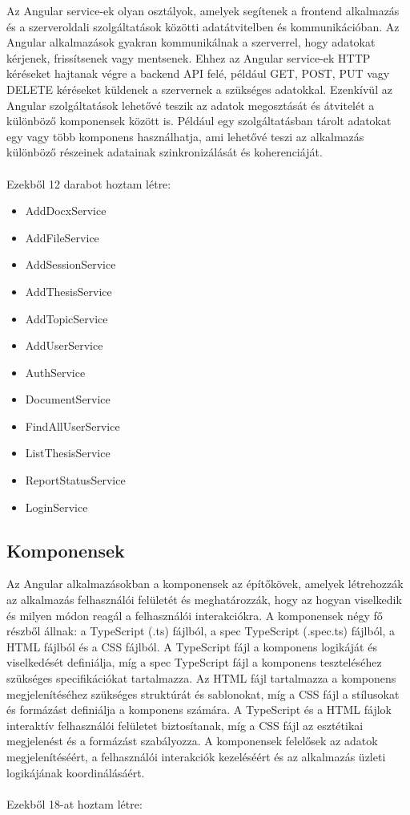 Az Angular\cite{angular} service-ek olyan osztályok, amelyek segítenek a frontend alkalmazás és a szerveroldali  szolgáltatások közötti adatátvitelben és kommunikációban. Az Angular alkalmazások gyakran kommunikálnak a szerverrel, hogy adatokat kérjenek, frissítsenek vagy mentsenek. Ehhez az Angular\cite{angular} service-ek HTTP\cite{http} kéréseket hajtanak végre a backend API felé, például GET, POST, PUT vagy DELETE kéréseket küldenek a szervernek a szükséges adatokkal. Ezenkívül az Angular\cite{angular} szolgáltatások lehetővé teszik az adatok megosztását és átvitelét a különböző komponensek között is. Például egy szolgáltatásban tárolt adatokat egy vagy több komponens használhatja, ami lehetővé teszi az alkalmazás különböző részeinek adatainak szinkronizálását és koherenciáját.\\
\\Ezekből 12 darabot hoztam létre:

\begin{itemize}

\item{AddDocxService}
\item{AddFileService}
\item{AddSessionService}
\item{AddThesisService}
\item{AddTopicService}
\item{AddUserService}
\item{AuthService}
\item{DocumentService}
\item{FindAllUserService}
\item{ListThesisService}
\item{ReportStatusService}
\item{LoginService}

\end{itemize}


\subsection{Komponensek}

Az Angular alkalmazásokban a komponensek az építőkövek, amelyek létrehozzák az alkalmazás felhasználói felületét és meghatározzák, hogy az hogyan viselkedik és milyen módon reagál a felhasználói interakciókra. A komponensek négy fő részből állnak: a TypeScript (.ts) fájlból, a spec TypeScript (.spec.ts) fájlból, a HTML fájlból és a CSS fájlból. A TypeScript fájl a komponens logikáját és viselkedését definiálja, míg a spec TypeScript fájl a komponens teszteléséhez szükséges specifikációkat tartalmazza. Az HTML fájl tartalmazza a komponens megjelenítéséhez szükséges struktúrát és sablonokat, míg a CSS fájl a stílusokat és formázást definiálja a komponens számára. A TypeScript és a HTML fájlok interaktív felhasználói felületet biztosítanak, míg a CSS fájl az esztétikai megjelenést és a formázást szabályozza. A komponensek felelősek az adatok megjelenítéséért, a felhasználói interakciók kezeléséért és az alkalmazás üzleti logikájának koordinálásáért.\\
\\
Ezekből 18-at hoztam létre:

